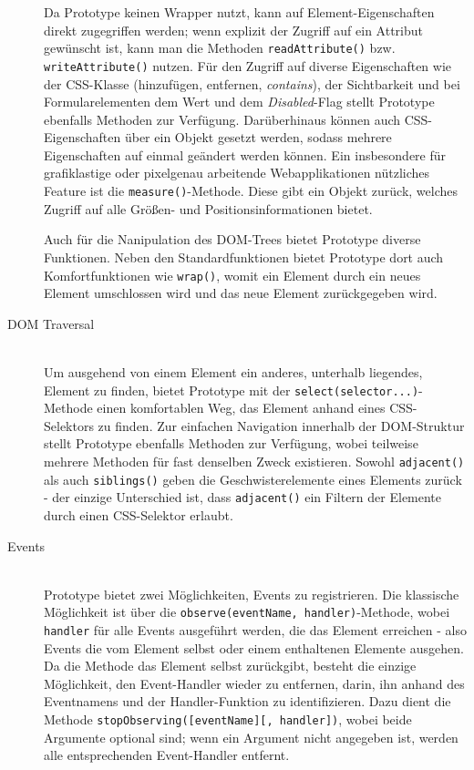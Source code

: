 \begin{description}
Da Prototype keinen Wrapper nutzt, kann auf Element-Eigenschaften direkt zugegriffen werden; wenn
explizit der Zugriff auf ein Attribut gewünscht ist, kann man die Methoden
\lstinline{readAttribute()} bzw. \lstinline{writeAttribute()} nutzen. Für den Zugriff auf diverse
Eigenschaften wie der CSS-Klasse (hinzufügen, entfernen, \emph{contains}), der Sichtbarkeit und bei
Formularelementen dem Wert und dem \emph{Disabled}-Flag  stellt Prototype ebenfalls Methoden zur
Verfügung. Darüberhinaus können auch CSS-Eigenschaften über ein Objekt gesetzt werden, sodass
mehrere Eigenschaften auf einmal geändert werden können. Ein insbesondere für grafiklastige oder
pixelgenau arbeitende Webapplikationen nützliches Feature ist die \lstinline{measure()}-Methode.
Diese gibt ein Objekt zurück, welches Zugriff auf alle Größen- und Positionsinformationen bietet.

Auch für die Nanipulation des DOM-Trees bietet Prototype diverse Funktionen. Neben den
Standardfunktionen bietet Prototype dort auch Komfortfunktionen wie \lstinline{wrap()}, womit ein
Element durch ein neues Element umschlossen wird und das neue Element zurückgegeben wird.

\item[DOM Traversal] \hfill \\
Um ausgehend von einem Element ein anderes, unterhalb liegendes, Element zu finden, bietet Prototype
mit der \lstinline{select(selector...)}-Methode einen komfortablen Weg, das Element anhand eines
CSS-Selektors zu finden. Zur einfachen Navigation innerhalb der DOM-Struktur stellt Prototype
ebenfalls Methoden zur Verfügung, wobei teilweise mehrere Methoden für fast denselben Zweck
existieren. Sowohl \lstinline{adjacent()} als auch \lstinline{siblings()} geben die
Geschwisterelemente eines Elements zurück - der einzige Unterschied ist, dass \lstinline{adjacent()}
ein Filtern der Elemente durch einen CSS-Selektor erlaubt.

\item[Events] \hfill \\
Prototype bietet zwei Möglichkeiten, Events zu registrieren. Die klassische Möglichkeit ist über die
\lstinline{observe(eventName, handler)}-Methode, wobei \lstinline{handler} für alle Events
ausgeführt werden, die das Element erreichen - also Events die vom Element selbst oder einem
enthaltenen Elemente ausgehen. Da die Methode das Element selbst zurückgibt, besteht die einzige
Möglichkeit, den Event-Handler wieder zu entfernen, darin, ihn anhand des Eventnamens und der
Handler-Funktion zu identifizieren. Dazu dient die Methode
\lstinline{stopObserving([eventName][, handler])}, wobei beide Argumente optional sind; wenn
ein Argument nicht angegeben ist, werden alle entsprechenden Event-Handler entfernt.


\end{description}
